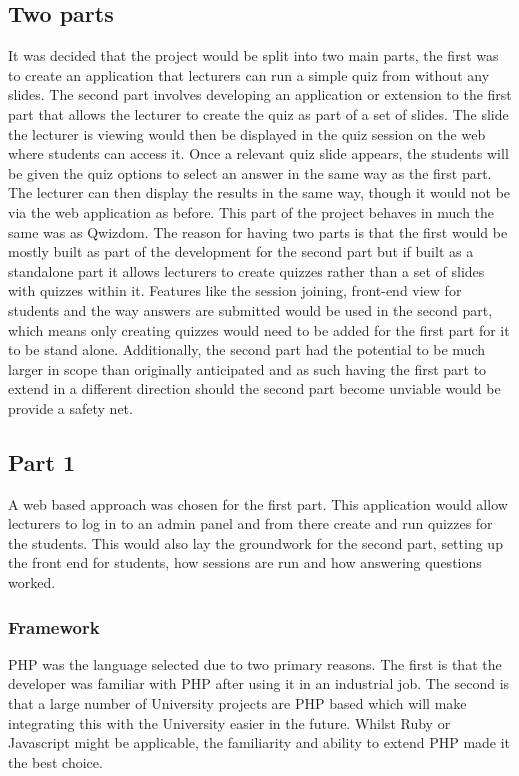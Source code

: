 \subsection{Two parts}
It was decided that the project would be split into two main parts, the first was to create an application that lecturers can run a simple quiz from without any slides. The second part involves developing an application or extension to the first part that allows the lecturer to create the quiz as part of a set of slides. The slide the lecturer is viewing would then be displayed in the quiz session on the web where students can access it. Once a relevant quiz slide appears, the students will be given the quiz options to select an answer in the same way as the first part. The lecturer can then display the results in the same way, though it would not be via the web application as before. This part of the project behaves in much the same was as Qwizdom.
The reason for having two parts is that the first would be mostly built as part of the development for the second part but if built as a standalone part it allows lecturers to create quizzes rather than a set of slides with quizzes within it. Features like the session joining, front-end view for students and the way answers are submitted would be used in the second part, which means only creating quizzes would need to be added for the first part for it to be stand alone. Additionally, the second part had the potential to be much larger in scope than originally anticipated and as such having the first part to extend in a different direction should the second part become unviable would be provide a safety net.

\subsection{Part 1}
A web based approach was chosen for the first part. This application would allow lecturers to log in to an admin panel and from there create and run quizzes for the students. This would also lay the groundwork for the second part, setting up the front end for students, how sessions are run and how answering questions worked. 
\subsubsection{Framework}
PHP was the language selected due to two primary reasons. The first is that the developer was familiar with PHP after using it in an industrial job. The second is that a large number of University projects are PHP based which will make integrating this with the University easier in the future. Whilst Ruby or Javascript might be applicable, the familiarity and ability to extend PHP made it the best choice.
